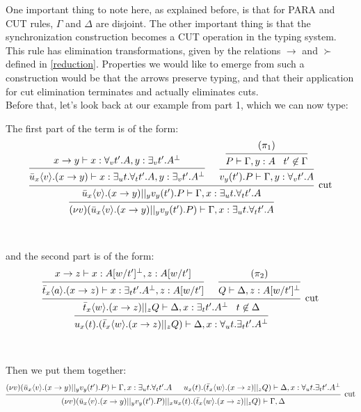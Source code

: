 One important thing to note here, as explained before, is that for PARA and CUT rules, $\Gamma$ and $\Delta$ are disjoint. The other important thing is that the synchronization construction becomes a CUT operation in the typing system. This rule has elimination transformations, given by the relations $\to$ and $\succ$ defined in \ref{reduction}. Properties we would like to emerge from such a construction would be that the arrows preserve typing, and that their application for cut elimination terminates and actually eliminates cuts.\\
Before that, let's look back at our example from part 1, which we can now type:

\example The first part of the term is of the form:
\[\begin{prooftree}
				\hypo{x\to y \vdash x:\forall_v t'.A, y:\exists_v t'.A^\bot}
			\infer1{\bar{u}_x\langle v\rangle.(x\to y) \vdash x:\exists_u t.\forall_t t'.A, y:\exists_v t'.A^\bot}
					\hypo{(\pi_1)}
				\infer1{P \vdash \Gamma, y:A\;\;\; t' \not\in \Gamma}
			\infer1{v_y(t').P \vdash \Gamma, y:\forall_v t'.A}
		\infer2[cut]{\bar{u}_x\langle v\rangle.(x\to y) ||_y v_y(t').P \vdash \Gamma, x:\exists_u t.\forall_t t'.A}
	\infer1{(\nu v)(\bar{u}_x\langle v\rangle.(x\to y) ||_y v_y(t').P) \vdash \Gamma, x:\exists_u t.\forall_t t'.A}
\end{prooftree}\]
~\\~\\
and the second part is of the form:
\[\begin{prooftree}
				\hypo{x\to z \vdash x:A[w/t']^\bot, z:A[w/t']}
			\infer1{\bar{t}_x\langle a\rangle.(x\to z) \vdash x:\exists_t t'.A^\bot, z:A[w/t']}
				\hypo{(\pi_2)}
			\infer1{Q \vdash \Delta, z:A[w/t']^\bot}
		\infer2[cut]{\bar{t}_x\langle w\rangle.(x\to z) ||_z Q \vdash \Delta, x:\exists_t t'.A^\bot\;\;\; t\not\in \Delta}
	\infer1{u_x(t).(\bar{t}_x\langle w\rangle.(x\to z) ||_z Q) \vdash \Delta, x:\forall_u t.\exists_t t'.A^\bot}
\end{prooftree}\]
~\\~\\
Then we put them together:
\[\begin{prooftree}
		\hypo{(\nu v)(\bar{u}_x\langle v\rangle.(x\to y) ||_y v_y(t').P) \vdash \Gamma, x:\exists_u t.\forall_t t'.A}
		\hypo{u_x(t).(\bar{t}_x\langle w\rangle.(x\to z) ||_z Q) \vdash \Delta, x:\forall_u t.\exists_t t'.A^\bot}
	\infer2[cut]{(\nu v)(\bar{u}_x\langle v\rangle.(x\to y) ||_y v_y(t').P) ||_x u_x(t).(\bar{t}_x\langle w\rangle.(x\to z) ||_z Q) \vdash \Gamma, \Delta}
\end{prooftree}\]

